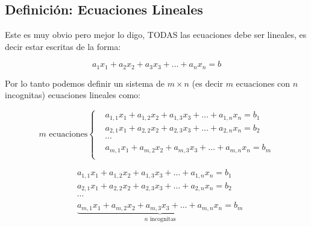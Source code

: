 \documentclass[12pt, fleqn]{report}                             %
\begin{document}
            \subsection{Definición: Ecuaciones Lineales}

                Este es muy obvio pero mejor lo digo, TODAS las ecuaciones debe ser lineales,
                es decir estar escritas de la forma:

                \begin{equation}
                    a_1x_1 + a_2x_2 + a_3x_3 + \dots + a_nx_n = b
                \end{equation}


                Por lo tanto podemos definir un sistema de $m \times n$ (es decir $m$ ecuaciones
                con $n$ incognitas) ecuaciones lineales como:

                \begin{equation*}
                    m \text{ ecuaciones}
                    \begin{cases}
                        & a_{1,1}x_1 + a_{1,2}x_2 + a_{1,3}x_3 + \dots + a_{1,n}x_n = b_1 \\
                        & a_{2,1}x_1 + a_{2,2}x_2 + a_{2,3}x_3 + \dots + a_{2,n}x_n = b_2 \\
                        & \cdots \\
                        & a_{m,1}x_1 + a_{m,2}x_2 + a_{m,3}x_3 + \dots + a_{m,n}x_n = b_m \\
                    \end{cases}      
                \end{equation*}

                \begin{equation*}
                    \begin{split}
                        &a_{1,1}x_1 + a_{1,2}x_2 + a_{1,3}x_3 + \dots + a_{1,n}x_n = b_1 \\
                        &a_{2,1}x_1 + a_{2,2}x_2 + a_{2,3}x_3 + \dots + a_{2,n}x_n = b_2 \\
                        &\cdots \\
                        &\underbrace{a_{m,1}x_1 + a_{m,2}x_2 + a_{m,3}x_3 + \dots + a_{m,n}x_n = b_m}_\text{$n$ incognitas}
                    \end{split}
                \end{equation*}
\end{document}

